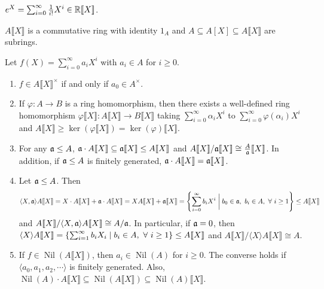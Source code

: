 \begin{example}
    $e^X = \sum_{i=0}^\infty \frac{1}{i!} X^i \in \mathbb{R} \llbracket X \rrbracket$.
\end{example}

\begin{theorem}
    $A \llbracket X \rrbracket$ is a commutative ring with identity $1_A$ and $A \subseteq A[X] \subseteq A \llbracket X \rrbracket$ are subrings.
\end{theorem}

\begin{proposition}
    Let $f(X) = \sum_{i=0}^\infty a_iX^i$ with $a_i \in A$ for $i \geq 0$.
    \begin{enumerate}
        \item $f \in A \llbracket X \rrbracket^\times$ if and only if $a_0 \in A^\times$.
        \item If $\varphi: A \to B$ is a ring homomorphism, then there exists a well-defined ring homomorphism $\varphi\llbracket X \rrbracket: A\llbracket X \rrbracket \to B\llbracket X \rrbracket$ taking $\sum_{i=0}^\infty \alpha_iX^i$ to $\sum_{i=0}^\infty \varphi(\alpha_i)X^i$ and $A\llbracket X \rrbracket \geq \ker(\varphi \llbracket X \rrbracket) = \ker(\varphi)\llbracket X \rrbracket$. 
        \item For any $\mathfrak{a} \leq A$, $\mathfrak{a} \cdot A \llbracket X \rrbracket \subseteq \mathfrak{a} \llbracket X \rrbracket \leq A\llbracket X \rrbracket$ and $A \llbracket X \rrbracket / \mathfrak{a} \llbracket X \rrbracket \cong \frac{A}{\mathfrak{a}} \llbracket X \rrbracket$. In addition, if $\mathfrak{a} \leq A$ is finitely generated, $\mathfrak{a} \cdot A\llbracket X \rrbracket = \mathfrak{a} \llbracket X \rrbracket$.
        \item Let $\mathfrak{a} \leq A$. Then 
            \[\langle X,\mathfrak{a} \rangle A\llbracket X \rrbracket = X \cdot A \llbracket X \rrbracket + \mathfrak{a} \cdot A \llbracket X \rrbracket = XA \llbracket X \rrbracket + \mathfrak{a} \llbracket X \rrbracket = \left\{\sum_{i=0}^\infty b_iX^i \mathrel{\bigg |} b_0 \in \mathfrak{a},\ b_i \in A, \ \forall \  i \geq 1\right\} \leq A \llbracket X \rrbracket\] 
            and $A \llbracket X \rrbracket / \langle X,\mathfrak{a} \rangle A \llbracket X \rrbracket \cong A/\mathfrak{a}$. In particular, if $\mathfrak{a} = 0$, then $\langle X \rangle A \llbracket X \rrbracket = \{\sum_{i=1}^\infty b_iX_i \mid b_i \in A, \ \forall \  i \geq 1\} \leq A\llbracket X \rrbracket$ and $A\llbracket X \rrbracket / \langle X \rangle A \llbracket X \rrbracket \cong A$. 
        \item If $f \in \operatorname{Nil}(A\llbracket X \rrbracket)$, then $a_i \in \operatorname{Nil}(A)$ for $i \geq 0$. The converse holds if $\langle a_0,a_1,a_2,\cdots \rangle$ is finitely generated. Also, $\operatorname{Nil}(A) \cdot A \llbracket X \rrbracket \subseteq \operatorname{Nil}(A \llbracket X \rrbracket) \subseteq \operatorname{Nil}(A) \llbracket X \rrbracket$.

\end{enumerate}
\end{proposition}
